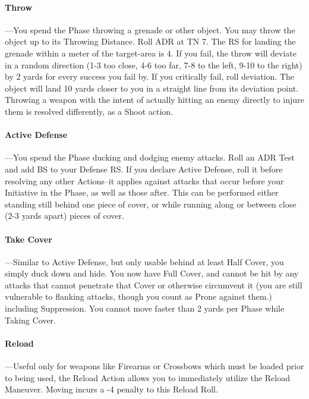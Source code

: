 \documentclass[oneside,11pt,english]{book}
\begin{document}
\paragraph{Throw}---\quad You spend the Phase throwing a grenade or other object. You may throw the object up to its
Throwing Distance. Roll ADR at TN 7. The RS for landing the grenade within a meter of the target-area
is 4. If you fail, the throw will deviate in a random direction (1-3 too close, 4-6 too far, 7-8 to the left,
9-10 to the right) by 2 yards for every success you fail by. If you critically fail, roll deviation. The object
will land 10 yards closer to you in a straight line from its deviation point.
Throwing a weapon with the intent of actually hitting an enemy directly to injure them is resolved
differently, as a Shoot action.

\paragraph{\label{par:Active Defense:} Active Defense}---\quad You spend the Phase ducking and dodging enemy attacks. Roll an ADR Test and add BS
to your Defense RS. If you declare Active Defense, roll it before resolving any other Actions--it applies
against attacks that occur before your Initiative in the Phase, as well as those after. This can be performed
either standing still behind one piece of cover, or while running along or between close (2-3 yards apart)
pieces of cover.

\paragraph{\label{par:Take Cover} Take Cover}---\quad Similar to Active Defense, but only usable behind at least Half Cover, you simply duck down and hide. You now have Full Cover, and cannot be hit by any attacks that cannot penetrate that
Cover or otherwise circumvent it (you are still vulnerable to flanking attacks, though you count as Prone
against them.) including Suppression. You cannot move faster than 2 yards per Phase while Taking
Cover.

\paragraph{\label{par:Reload}Reload}---\quad Useful only for weapons like Firearms or Crossbows which must be loaded prior to being used, the Reload Action allows you to immediately utilize the Reload Maneuver. Moving incurs a -4 penalty to this Reload Roll.
\end{document}
